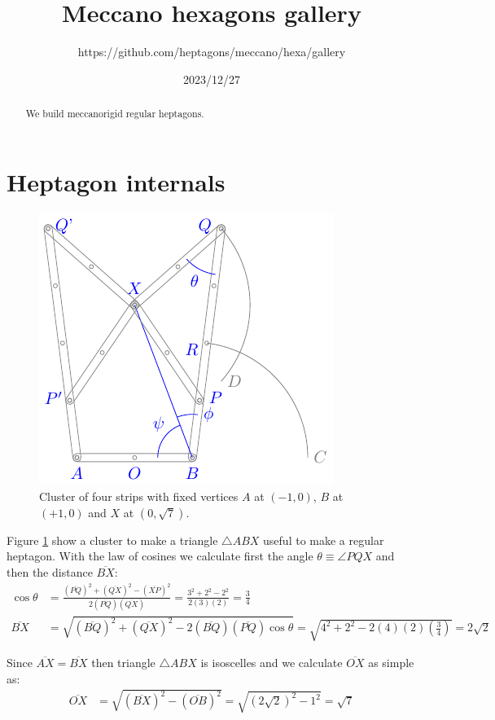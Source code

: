 \documentclass[11pt]{article}
\title{Meccano hexagons gallery}
\author{https://github.com/heptagons/meccano/hexa/gallery}
\date{2023/12/27}
\begin{document}
\maketitle
\begin{abstract}
We build meccano\meccanoref rigid regular heptagons.
\end{abstract}

\section{Heptagon internals}

\begin{figure}[h]
\centering
\includegraphics[scale=1.1]{builder/hepta-base}
\caption{Cluster of four strips with fixed vertices $A$ at $(-1,0)$, $B$ at $(+1,0)$ and $X$ at $(0,\sqrt7)$.}
\label{fig:build-base}
\end{figure}

Figure \ref{fig:build-base} show a cluster to make a triangle $\triangle{ABX}$ useful to make a regular heptagon. With the law of cosines we calculate first the angle $\theta \equiv \angle{PQX}$ and then the distance $\overline{BX}$:
\begin{align}
\cos\theta &= \frac{(\overline{PQ})^2 + (\overline{QX})^2 - (\overline{XP})^2}
 {2(\overline{PQ})(\overline{QX})} 
 = \frac{3^2 + 2^2 - 2^2}{2(3)(2)} = \frac{3}4 \label{eq:theta} \\
\overline{BX} &= \sqrt{(\overline{BQ})^2 + (\overline{QX})^2 
 - 2(\overline{BQ})(\overline{PQ})\cos\theta}
 = \sqrt{4^2 + 2^2 - 2(4)(2)\left(\frac{3}4\right)} = 2\sqrt2
\end{align}

Since $\overline{AX} = \overline{BX}$ then triangle $\triangle{ABX}$ is isoscelles and we calculate $\overline{OX}$ as simple as:
\begin{align}
\overline{OX} &= \sqrt{(\overline{BX})^2 - (\overline{OB})^2}
 = \sqrt{(2\sqrt2)^2 - 1^2} = \sqrt7
\end{align}
\end{document}
